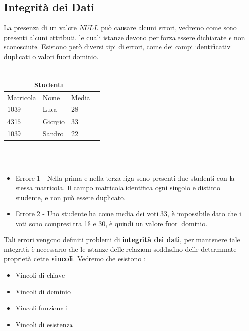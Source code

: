 \documentclass[12pt, letterpaper]{article}
\begin{document}
 \subsection{Integrità dei Dati}\label{intDeiDati}
 La presenza di un valore \(NULL\) può causare alcuni errori, vedremo come sono presenti alcuni attributi, le quali
 istanze devono per forza essere dichiarate e non sconosciute. Esistono però diversi tipi di errori, come
 dei campi identificativi duplicati o valori fuori dominio.
 \\\centering
\hphantom{.}\\
\begin{tabular}{|l|l|l|r|}
    \hline
\multicolumn{3}{|c|}{\textbf{Studenti}}\\
\hline
Matricola & Nome & Media \\
\hline
\color{red}1039\color{black} & Luca & 28 \\
\hline
4316 & Giorgio & \color{blue}33\color{black} \\
\hline
\color{red}1039\color{black} & Sandro & 22 \\
\hline
\end{tabular}
\\ 
 \hphantom{.}\\
 \raggedright
 \begin{itemize}
    \color{red}\item Errore 1 - \color{black} Nella prima e nella terza riga sono presenti due studenti con la stessa matricola. Il campo matricola 
    identifica ogni singolo e distinto studente, e non può essere duplicato.
    \color{blue}\item Errore 2 - \color{black} Uno studente ha come media dei voti 33, è impossibile dato che i voti sono compresi tra
    18 e 30, è quindi un valore fuori dominio.
    
 \end{itemize}
Tali errori vengono definiti problemi di \textbf{integrità dei dati}, per mantenere tale integrità è necessario
che le istanze delle relazioni soddisfino delle determinate proprietà dette \textbf{vincoli}. Vedremo che esistono :
\begin{itemize}
    \item Vincoli di chiave
    \item Vincoli di dominio
    \item Vincoli funzionali
    \item Vincoli di esistenza
\end{itemize}
\centering
\hphantom{.}\\
\end{document}
